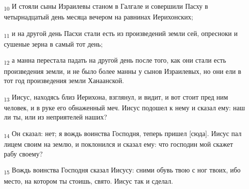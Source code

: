 \begin{tcolorbox}
\textsubscript{10} И стояли сыны Израилевы станом в Галгале и совершили Пасху в четырнадцатый день месяца вечером на равнинах Иерихонских;
\end{tcolorbox}
\begin{tcolorbox}
\textsubscript{11} и на другой день Пасхи стали есть из произведений земли сей, опресноки и сушеные зерна в самый тот день;
\end{tcolorbox}
\begin{tcolorbox}
\textsubscript{12} а манна перестала падать на другой день после того, как они стали есть произведения земли, и не было более манны у сынов Израилевых, но они ели в тот год произведения земли Ханаанской.
\end{tcolorbox}
\begin{tcolorbox}
\textsubscript{13} Иисус, находясь близ Иерихона, взглянул, и видит, и вот стоит пред ним человек, и в руке его обнаженный меч. Иисус подошел к нему и сказал ему: наш ли ты, или из неприятелей наших?
\end{tcolorbox}
\begin{tcolorbox}
\textsubscript{14} Он сказал: нет; я вождь воинства Господня, теперь пришел [сюда]. Иисус пал лицем своим на землю, и поклонился и сказал ему: что господин мой скажет рабу своему?
\end{tcolorbox}
\begin{tcolorbox}
\textsubscript{15} Вождь воинства Господня сказал Иисусу: сними обувь твою с ног твоих, ибо место, на котором ты стоишь, свято. Иисус так и сделал.
\end{tcolorbox}
